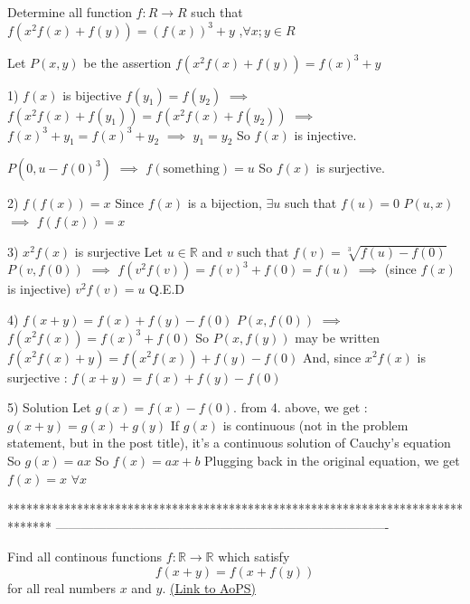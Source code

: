 \begin{solution}
	\begin{tcolorbox}Determine all function $ f: R\to R$ such that
                  $ f(x^2f(x) + f(y)) = (f(x))^3 + y$ ,$ \forall x;y\in R$\end{tcolorbox}

Let $ P(x,y)$ be the assertion $ f(x^2f(x)+f(y))=f(x)^3+y$

1) $ f(x)$ is bijective 
$ f(y_1)=f(y_2)$ $ \implies$ $ f(x^2f(x)+f(y_1))=f(x^2f(x)+f(y_2))$ $ \implies$ $ f(x)^3+y_1=f(x)^3+y_2$ $ \implies$ $ y_1=y_2$
So $ f(x)$ is injective.

$ P(0,u-f(0)^3)$ $ \implies$ $ f(\text{something})=u$ 
So $ f(x)$ is surjective.

2) $ f(f(x))=x$
Since $ f(x)$ is a bijection, $ \exists u$ such that $ f(u)=0$
$ P(u,x)$ $ \implies$ $ f(f(x))=x$

3) $ x^2f(x)$ is surjective
Let $ u\in\mathbb R$ and $ v$ such that $ f(v)= \sqrt[3]{f(u)-f(0)}$
$ P(v,f(0))$ $ \implies$ $ f(v^2f(v))=f(v)^3+f(0)=f(u)$ $ \implies$ (since $ f(x)$ is injective) $ v^2f(v)=u$
Q.E.D

4) $ f(x+y)=f(x)+f(y)-f(0)$
$ P(x,f(0))$ $ \implies$ $ f(x^2f(x))=f(x)^3+f(0)$
So $ P(x,f(y))$ may be written $ f(x^2f(x)+y)=f(x^2f(x))+f(y)-f(0)$
And, since $ x^2f(x)$ is surjective : $ f(x+y)=f(x)+f(y)-f(0)$

5) Solution
Let $ g(x)=f(x)-f(0)$. from 4. above, we get : $ g(x+y)=g(x)+g(y)$
If $ g(x)$ is continuous (not in the problem statement, but in the post title), it's a continuous solution of Cauchy's equation
So $ g(x)=ax$
So $ f(x)=ax+b$
Plugging back in the original equation, we get $ \boxed{f(x)=x}$ $ \forall x$
\end{solution}
*******************************************************************************
-------------------------------------------------------------------------------

\begin{problem}
	Find all continous functions $f: \mathbb R \to \mathbb R$ which satisfy
\[ f(x+y)=f(x+f(y))\]
for all real numbers $x$ and $y$.
	\flushright \href{https://artofproblemsolving.com/community/c6h314628}{(Link to AoPS)}
\end{problem}



